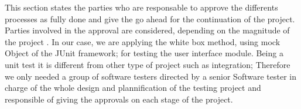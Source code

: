 This section states the parties who are responsable to approve the differents processes as fully done and give the go ahead for the continuation of the project.    
Parties involved in the approval  are considered, depending on the magnitude of the project . In our case, we are applying the white box method, using mock Object of the JUnit framework; for testing the user interface module. Being a unit test it is different from other type of project such as integration; Therefore we only needed a group of software testers directed by a senior Software tester in charge of the whole design and plannification of the testing project and responsible of giving the approvals on each stage of the project.                              